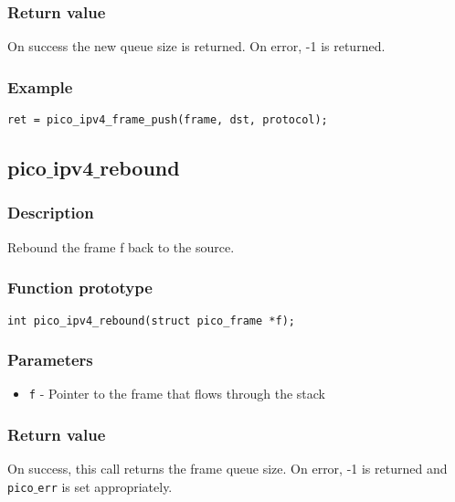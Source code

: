 \subsubsection*{Return value}
On success the new queue size is returned. On error, -1 is returned.


\subsubsection*{Example}
\begin{verbatim}
ret = pico_ipv4_frame_push(frame, dst, protocol);
\end{verbatim}


\subsection{pico$\_$ipv4$\_$rebound}

\subsubsection*{Description}
Rebound the frame f back to the source.

\subsubsection*{Function prototype}
\begin{verbatim}
int pico_ipv4_rebound(struct pico_frame *f);
\end{verbatim}

\subsubsection*{Parameters}
\begin{itemize}[noitemsep]
\item \texttt{f} - Pointer to the frame that flows through the stack
\end{itemize}

\subsubsection*{Return value}
On success, this call returns the frame queue size.
On error, -1 is returned and \texttt{pico$\_$err} is set appropriately.

